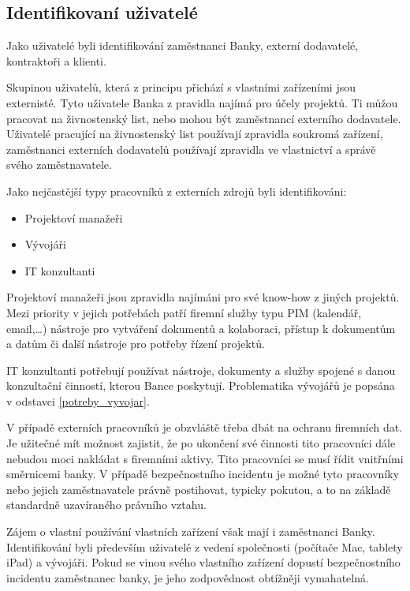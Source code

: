 \subsection{Identifikovaní uživatelé}
Jako uživatelé byli identifikování zaměstnanci Banky, externí dodavatelé, kontraktoři a klienti.

Skupinou uživatelů, která z principu přichází s vlastními zařízeními jsou externisté. Tyto uživatele Banka z pravidla najímá pro účely projektů. Ti můžou pracovat na živnostenský list, nebo mohou být zaměstnancí externího dodavatele. Uživatelé pracující na živnostenský list používají zpravidla soukromá zařízení, zaměstnanci externích dodavatelů používají zpravidla ve vlastnictví a správě svého zaměstnavatele.

Jako nejčastější typy pracovníků z externích zdrojů byli identifikováni:
\begin{itemize}
    \item Projektoví manažeři
    \item Vývojáři
    \item IT konzultanti
\end{itemize}

Projektoví manažeři jsou zpravidla najímáni pro své know-how z jiných projektů. Mezi priority v jejich potřebách patří firemní služby typu PIM (kalendář, email,\ldots) nástroje pro vytváření dokumentů a kolaboraci, přístup k dokumentům a datům či další nástroje pro potřeby řízení projektů. 

IT konzultanti potřebují používat nástroje, dokumenty a služby spojené s danou konzultační činností, kterou Bance poskytují. Problematika vývojářů je popsána v odstavci \ref{potreby_vyvojar}.

V případě externích pracovníků je obzvláště třeba dbát na ochranu firemních dat. Je užitečné mít možnost zajistit, že po ukončení své činnosti tito pracovníci dále nebudou moci nakládat s firemními aktivy. Tito pracovníci se musí řídit vnitřními směrnicemi banky. V případě bezpečnostního incidentu je možné tyto pracovníky nebo jejich zaměstnavatele právně postihovat, typicky pokutou, a to na základě standardně uzavíraného právního vztahu.

Zájem o vlastní používání vlastních zařízení však mají i zaměstnanci Banky. Identifikování byli především uživatelé z vedení společnosti (počítače Mac, tablety iPad) a vývojáři. Pokud se vinou svého vlastního zařízení dopustí bezpečnostního incidentu zaměstnanec banky, je jeho zodpovědnost obtížněji vymahatelná.

